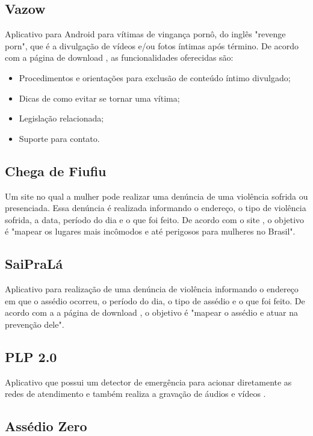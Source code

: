 \subsection*{Vazow}

Aplicativo para Android para vítimas de vingança pornô, do inglês "revenge porn", que é a 
divulgação de vídeos e/ou fotos íntimas após término.
De acordo com a página de download \cite{vazow}, as funcionalidades oferecidas são:

\begin{itemize}
	\item Procedimentos e orientações para exclusão de conteúdo íntimo divulgado;
	\item Dicas de como evitar se tornar uma vítima;
	\item Legislação relacionada;
	\item Suporte para contato.
\end{itemize}

\subsection*{Chega de Fiufiu}

Um site no qual a mulher pode realizar uma denúncia de uma violência sofrida ou presenciada. 
Essa denúncia é realizada informando o endereço, o tipo de violência sofrida, a data, período do dia e o que foi feito. 
De acordo com o site \cite{chegadefiufiu}, o objetivo é "mapear 
os lugares mais incômodos e até perigosos para mulheres no Brasil".

\subsection*{SaiPraLá}

Aplicativo para realização de uma denúncia de violência informando o endereço em que o assédio ocorreu, 
o período do dia, o tipo de assédio e o que foi feito. 
De acordo com a a página de download \cite{saiprala}, o objetivo é "mapear o assédio e atuar na prevenção dele".

\subsection*{PLP 2.0}
Aplicativo que possui um detector de emergência para acionar diretamente as redes de atendimento 
e também realiza a gravação de áudios e vídeos \cite{plp}.

\subsection*{Assédio Zero}


